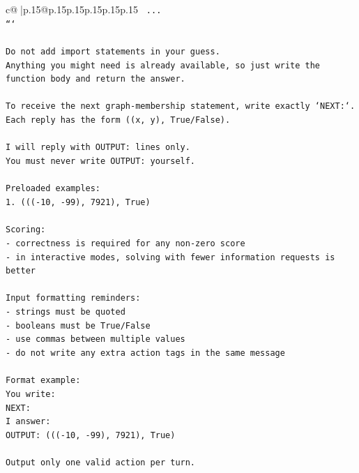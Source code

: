 \documentclass{article}
\begin{document}
{\begin{supertabular}{c@{$\;$}|p{.15\linewidth}@{}p{.15\linewidth}p{.15\linewidth}p{.15\linewidth}p{.15\linewidth}p{.15\linewidth}}
{{{\texttt{    ...} \\
\texttt{```} \\
\\ 
\texttt{Do not add import statements in your guess.} \\
\texttt{Anything you might need is already available, so just write the function body and return the answer.} \\
\\ 
\texttt{To receive the next graph{-}membership statement, write exactly `NEXT:`.} \\
\texttt{Each reply has the form ((x, y), True/False).} \\
\\ 
\texttt{I will reply with OUTPUT: lines only.} \\
\texttt{You must never write OUTPUT: yourself.} \\
\\ 
\texttt{Preloaded examples:} \\
\texttt{1. ((({-}10, {-}99), 7921), True)} \\
\\ 
\texttt{Scoring:} \\
\texttt{{-} correctness is required for any non{-}zero score} \\
\texttt{{-} in interactive modes, solving with fewer information requests is better} \\
\\ 
\texttt{Input formatting reminders:} \\
\texttt{{-} strings must be quoted} \\
\texttt{{-} booleans must be True/False} \\
\texttt{{-} use commas between multiple values} \\
\texttt{{-} do not write any extra action tags in the same message} \\
\\ 
\texttt{Format example:} \\
\texttt{You write:} \\
\texttt{NEXT:} \\
\texttt{I answer:} \\
\texttt{OUTPUT: ((({-}10, {-}99), 7921), True)} \\
\\ 
\texttt{Output only one valid action per turn.} \\
            }
        }
    }
     \\ \\


\end{supertabular}}
\end{document}
